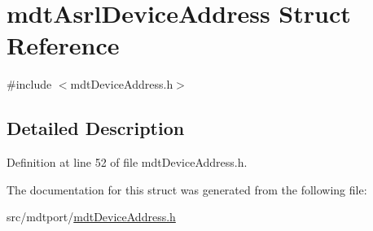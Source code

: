\hypertarget{structmdt_asrl_device_address}{\section{mdt\-Asrl\-Device\-Address Struct Reference}
\label{structmdt_asrl_device_address}
}


{\ttfamily \#include $<$mdt\-Device\-Address.\-h$>$}



\subsection{Detailed Description}


Definition at line 52 of file mdt\-Device\-Address.\-h.



The documentation for this struct was generated from the following file\-:\begin{DoxyCompactItemize}
\item 
src/mdtport/\hyperlink{mdt_device_address_8h}{mdt\-Device\-Address.\-h}\end{DoxyCompactItemize}
